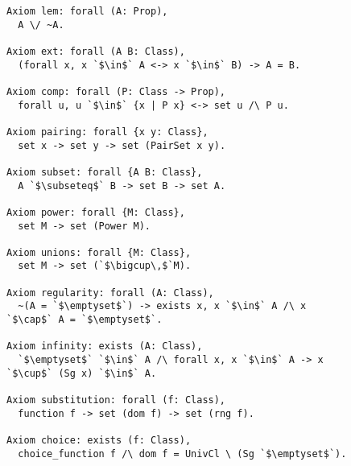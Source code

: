 \begin{figure}
\begin{lstlisting}[language=Coq, xleftmargin=\mathindent, escapechar=`,
label=lst:MK-Axiome, caption={Axiome der Mengenlehre}]
Axiom lem: forall (A: Prop),
  A \/ ~A.

Axiom ext: forall (A B: Class),
  (forall x, x `$\in$` A <-> x `$\in$` B) -> A = B.

Axiom comp: forall (P: Class -> Prop),
  forall u, u `$\in$` {x | P x} <-> set u /\ P u.

Axiom pairing: forall {x y: Class},
  set x -> set y -> set (PairSet x y).

Axiom subset: forall {A B: Class},
  A `$\subseteq$` B -> set B -> set A.

Axiom power: forall {M: Class},
  set M -> set (Power M).

Axiom unions: forall {M: Class},
  set M -> set (`$\bigcup\,$`M).

Axiom regularity: forall (A: Class),
  ~(A = `$\emptyset$`) -> exists x, x `$\in$` A /\ x `$\cap$` A = `$\emptyset$`.

Axiom infinity: exists (A: Class),
  `$\emptyset$` `$\in$` A /\ forall x, x `$\in$` A -> x `$\cup$` (Sg x) `$\in$` A.

Axiom substitution: forall (f: Class),
  function f -> set (dom f) -> set (rng f).

Axiom choice: exists (f: Class),
  choice_function f /\ dom f = UnivCl \ (Sg `$\emptyset$`).
\end{lstlisting}
\end{figure}
